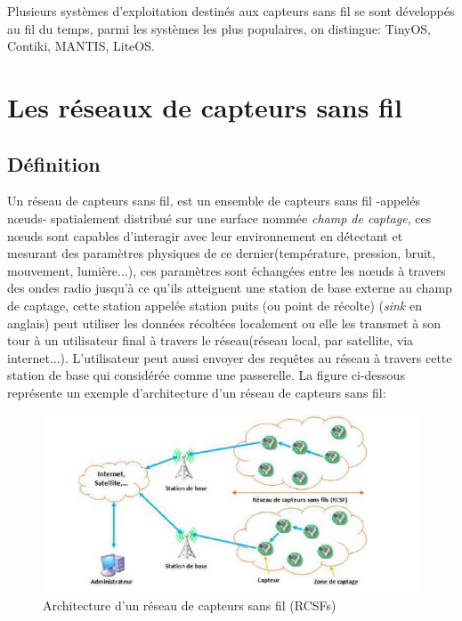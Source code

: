  Plusieurs systèmes d'exploitation destinés aux capteurs sans fil se sont développés au fil du temps, parmi les systèmes les plus populaires, on distingue: TinyOS, Contiki, MANTIS, LiteOS.




		 \newpage

\section{Les réseaux de capteurs sans fil}
\subsection{Définition}
Un réseau de capteurs sans fil, est un ensemble de capteurs  sans fil -appelés nœuds- spatialement distribué sur une surface nommée \emph{champ de captage}, ces nœuds sont capables d'interagir avec leur environnement en détectant et mesurant des paramètres physiques de ce dernier(température, pression, bruit, mouvement, lumière...), ces paramètres sont échangées entre les nœuds à travers des ondes radio jusqu'à ce qu'ils atteignent une station de base externe au champ de captage, cette station appelée station puits (ou point de récolte) (\emph{sink} en anglais) peut utiliser les données récoltées localement ou elle les transmet à son tour  à un utilisateur final à  travers le réseau(réseau local, par satellite, via internet...). L'utilisateur peut aussi envoyer des requêtes au réseau à travers cette station de base qui considérée comme une passerelle.
La figure ci-dessous représente un exemple d'architecture d'un réseau de capteurs sans fil:
\begin{figure}[h]
\begin{center}
\includegraphics[scale=1]{Chapitre1/wsn_archi.png}
\caption{Architecture d'un réseau de capteurs sans fil (RCSFs)}
\end{center}
\end{figure}


